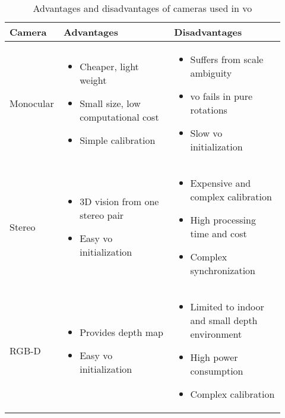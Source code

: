 \begin{table}[h!]
	\centering
	\begin{tabular}{ |m{0.12\linewidth} | m{0.40\linewidth} | m{0.40\linewidth} |}
		\hline 
		\textbf{Camera} & \textbf{Advantages}  & \textbf{Disadvantages} \\ [1ex] \hline
		Monocular & \begin{itemize} 
				 		\item Cheaper, light weight
						\item Small size, low computational cost 
						\item Simple calibration 
				   \end{itemize} & 
			       \begin{itemize} 
			       	\item Suffers from scale ambiguity
			       	\item \acrshort{vo} fails in pure rotations
			       	\item Slow \acrshort{vo} initialization
			       \end{itemize} \\ \hline
		Stereo & \begin{itemize} 
					\item 3D vision from one stereo pair
					\item Easy \acrshort{vo} initialization
				\end{itemize} & 
				\begin{itemize} 
					\item Expensive and complex calibration
					\item High processing time and cost
					\item Complex synchronization
				\end{itemize} \\ \hline
		RGB-D  & \begin{itemize} 
					\item Provides depth map 
					\item Easy \acrshort{vo} initialization
				\end{itemize} & 
				\begin{itemize} 
					\item Limited to indoor and small depth environment
					\item High power consumption
					\item Complex calibration
				\end{itemize} \\ \hline
	\end{tabular}
	\caption{Advantages and disadvantages of cameras used in \acrshort{vo}}
	\label{table:cameracomp}  
\end{table}
